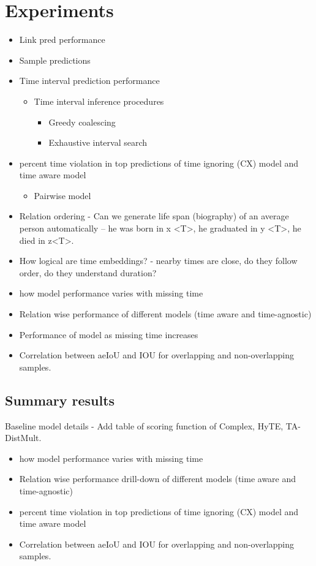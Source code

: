 \documentclass[12pt,a4paper]{article}
\def\complex{CX}
\begin{document}
\section{Experiments}
\begin{itemize}
    \item Link pred performance
    \item Sample predictions
    \item Time interval prediction performance
    \begin{itemize}
        \item Time interval inference procedures
        \begin{itemize}
            \item Greedy coalescing
            \item Exhaustive interval search
        \end{itemize}
    \end{itemize}
    \item percent time violation in top predictions of time ignoring (CX) model and time aware model
    \begin{itemize}
        \item Pairwise model
    \end{itemize}
    \item Relation ordering - Can we generate life span (biography) of an average person automatically -- he was born in x <T>, he graduated in y <T>, he died in z<T>.
    \item How logical are time embeddings? - nearby times are close, do they follow order, do they understand duration?
    \item how model performance varies with missing time 
    \item Relation wise performance of different models (time aware and time-agnostic)
    \item Performance of model as missing time increases
    \item Correlation between aeIoU and IOU for overlapping and non-overlapping samples.
\end{itemize}


\subsection{Summary results}

Baseline model details - Add table of scoring function of Complex,
 HyTE, TA-DistMult.

\begin{itemize}
\item how model performance varies with missing time 
\item Relation wise performance drill-down of different models (time aware and time-agnostic)
\item percent time violation in top predictions of time ignoring (\complex{}) model and time aware model
\item Correlation between aeIoU and IOU for overlapping and non-overlapping samples.
\end{itemize}


\endgroup
\end{document}
